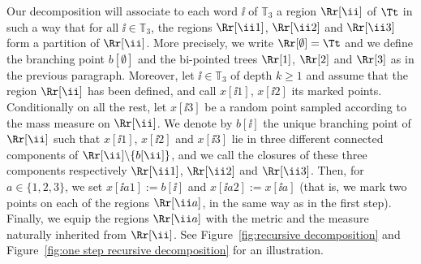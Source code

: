 Our decomposition will associate to each word $\ii $ of $\mathbb{T}_3$ a region $\Rr[\ii ]$ of $\Tt$ in such a way that for all $\ii \in \mathbb{T}_3$, the regions $\Rr[\ii 1]$, $\Rr[\ii 2]$ and $\Rr[\ii 3]$ form a partition of $\Rr[\ii ]$.
More precisely, we write $\Rr[\emptyset]=\Tt$ and we define the branching point $b[\emptyset]$ and the bi-pointed trees $\Rr[1]$, $\Rr[2]$ and $\Rr[3]$ as in the previous paragraph.
Moreover, let $\ii \in \mathbb{T}_3$ of depth $k \geq 1$ and assume that the region $\Rr[\ii ]$ has been defined, and call $x[\ii 1]$, $x[\ii 2]$ its marked points.
Conditionally on all the rest, let $x[\ii 3]$ be a random point sampled according to the mass measure on $\Rr[\ii ]$.
We denote by $b[\ii]$ the unique branching point of $\Rr[\ii ]$ such that $x[\ii 1]$, $x[\ii 2]$ and $x[\ii 3]$ lie in three different connected components of $\Rr[\ii ] \backslash \{b[\ii]\}$, and we call the closures of these three components respectively $\Rr[\ii 1]$, $\Rr[\ii 2]$ and $\Rr[\ii 3]$.
Then, for $a \in \{1,2,3\}$, we set $x[\ii a1]:=b[\ii]$ and $x[\ii a 2]:=x[\ii a]$ (that is, we mark two points on each of the regions $\Rr[\ii a]$, in the same way as in the first step).
Finally, we equip the regions $\Rr[\ii a]$ with the metric and the measure naturally inherited from $\Rr[\ii ]$.
See Figure~\ref{fig:recursive decomposition} and Figure~\ref{fig:one step recursive decomposition} for an illustration.

